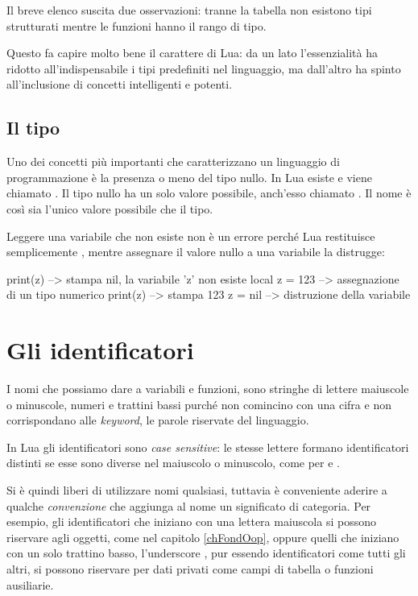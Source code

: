 Il breve elenco suscita due osservazioni: tranne la tabella non esistono
tipi strutturati mentre le funzioni hanno il rango di tipo.

Questo fa capire molto bene il carattere di Lua: da un lato l'essenzialità ha
ridotto all'indispensabile i tipi predefiniti nel linguaggio, ma dall'altro ha
spinto all'inclusione di concetti intelligenti e potenti.


\subsection{Il tipo }
\label{secFondTipoNil}

Uno dei concetti più importanti che caratterizzano un linguaggio di
programmazione è la presenza o meno del tipo nullo. In Lua esiste e viene
chiamato . Il tipo nullo ha un solo valore possibile,
anch'esso chiamato . Il nome è così sia l'unico valore possibile che il
tipo.

Leggere una variabile che non esiste non è un errore perché Lua restituisce
semplicemente , mentre assegnare il valore nullo a una variabile la
distrugge:
\begin{lines}
print(z)      --> stampa nil, la variabile 'z' non esiste
local z = 123 --> assegnazione di un tipo numerico
print(z)      --> stampa 123
z = nil       --> distruzione della variabile
\end{lines}


\section{Gli identificatori}

I nomi che possiamo dare a variabili e funzioni, sono stringhe di lettere
maiuscole o minuscole, numeri e trattini bassi \luas{\_} purché non
comincino con una cifra e non corrispondano alle \emph{keyword}, le parole
riservate del linguaggio.

In Lua gli identificatori sono \emph{case sensitive}: le stesse lettere formano
identificatori distinti se esse sono diverse nel maiuscolo o minuscolo, come per
 e .

Si è quindi liberi di utilizzare nomi qualsiasi, tuttavia è conveniente aderire
a qualche \emph{convenzione} che aggiunga al nome un significato di categoria.
Per esempio, gli identificatori che iniziano con una lettera maiuscola si
possono riservare agli oggetti, come nel capitolo \ref{chFondOop}, oppure quelli
che iniziano con un solo trattino basso, l'underscore , pur essendo
identificatori come tutti gli altri, si possono riservare per dati privati come
campi di tabella o funzioni ausiliarie.

